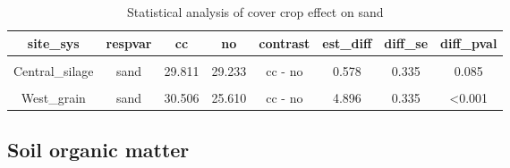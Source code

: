 \documentclass[
]{article}
\begin{document}
\begin{table}[H]

\caption{\label{tab:clay}Statistical analysis of cover crop effect on sand}
\centering
\begin{tabular}[t]{cccccccc}
\toprule
site\_sys & respvar & cc & no & contrast & est\_diff & diff\_se & diff\_pval\\
\midrule
\cellcolor{gray!6}{Central\_grain} & \cellcolor{gray!6}{sand} & \cellcolor{gray!6}{32.486} & \cellcolor{gray!6}{31.600} & \cellcolor{gray!6}{cc - no} & \cellcolor{gray!6}{0.886} & \cellcolor{gray!6}{0.299} & \cellcolor{gray!6}{0.003}\\
Central\_silage & sand & 29.811 & 29.233 & cc - no & 0.578 & 0.335 & 0.085\\
\cellcolor{gray!6}{East\_grain} & \cellcolor{gray!6}{sand} & \cellcolor{gray!6}{12.715} & \cellcolor{gray!6}{9.837} & \cellcolor{gray!6}{cc - no} & \cellcolor{gray!6}{2.877} & \cellcolor{gray!6}{0.335} & \cellcolor{gray!6}{<0.001}\\
West\_grain & sand & 30.506 & 25.610 & cc - no & 4.896 & 0.335 & <0.001\\
\bottomrule
\end{tabular}
\end{table}

\hypertarget{soil-organic-matter}{%
\subsection{Soil organic matter}\label{soil-organic-matter}}
\end{document}
